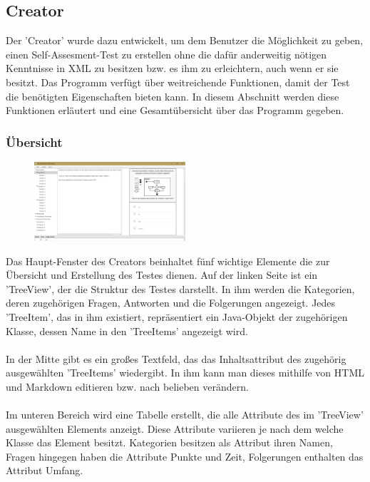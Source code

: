 \label{Julian}
\subsection{Creator}
Der 'Creator' wurde dazu entwickelt, um dem Benutzer die Möglichkeit zu geben, einen Self-Assesment-Test zu erstellen ohne die dafür anderweitig nötigen Kenntnisse in XML zu besitzen bzw. es ihm zu erleichtern, auch wenn er sie besitzt. Das Programm verfügt über weitreichende Funktionen, damit der Test die benötigten Eigenschaften bieten kann. In diesem Abschnitt werden diese Funktionen erläutert und eine Gesamtübersicht über das Programm gegeben. 

\subsubsection*{Übersicht}
\begin{figure}[htbp] 
  \centering
     \includegraphics[width=0.5\textwidth]{Julian_Images/Creator-Uebersicht.png}
  \caption{}
  \label{fig:Bild0}
\end{figure}
Das Haupt-Fenster des Creators beinhaltet fünf wichtige Elemente die zur Übersicht und Erstellung des Testes dienen. Auf der linken Seite ist ein 'TreeView', der die Struktur des Testes darstellt. In ihm werden die Kategorien, deren zugehörigen Fragen, Antworten und die Folgerungen angezeigt. Jedes 'TreeItem', das in ihm existiert, repräsentiert ein Java-Objekt der zugehörigen Klasse, dessen Name in den 'TreeItems' angezeigt wird.
\\
\\
In der Mitte gibt es ein großes Textfeld, das das Inhaltsattribut des zugehörig ausgewählten 'TreeItems' wiedergibt. In ihm kann man dieses mithilfe von HTML und Markdown editieren bzw. nach belieben verändern.
\\
\\
Im unteren Bereich wird eine Tabelle erstellt, die alle Attribute des im 'TreeView'  ausgewählten Elements anzeigt. Diese Attribute variieren je nach dem welche Klasse das Element besitzt. Kategorien besitzen als Attribut ihren Namen, Fragen hingegen haben die Attribute Punkte und Zeit, Folgerungen enthalten das Attribut Umfang.
